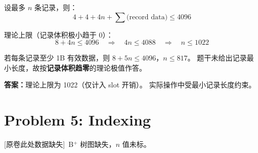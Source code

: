 \documentclass[11pt,a4paper]{article}
\newcommand{\answer}{\par\noindent\textcolor{ansred}{\textbf{答案：}}}
\newcommand{\missingnote}{\textcolor{ansred}{[原卷此处数据缺失]}}
\begin{document}
\begin{enumerate}[leftmargin=*,itemsep=6pt]
  设最多 $n$ 条记录，则：
  \[4 + 4 + 4n + \sum\text{(record data)} \le 4096\]

  理论上限（记录体积极小趋于 0）：
  \[8 + 4n \le 4096 \quad\Rightarrow\quad 4n \le 4088 \quad\Rightarrow\quad
    n \le 1022\]

  若每条记录至少 1B 有效数据，则 $8 + 5n \le 4096$，$n \le 817$。
  题干未给出记录最小长度，故按\textbf{记录体积趋零}的理论极值作答。

  \answer 理论上限为 \textcolor{ansred}{1022}（仅计入 slot 开销）。
  实际操作中受最小记录长度约束。
\end{enumerate}

\section*{Problem 5: Indexing}

\missingnote\  B$^+$ 树图缺失，$n$ 值未标。
\end{document}
